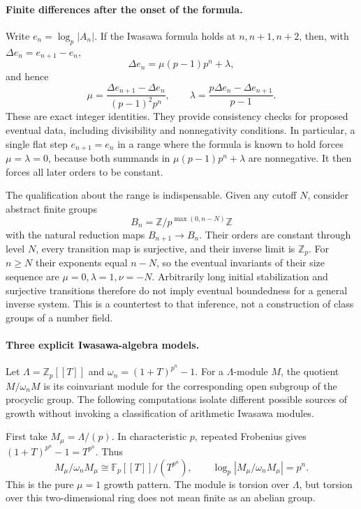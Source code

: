 \documentclass[11pt]{article}
\begin{document}
\paragraph{Finite differences after the onset of the formula.}
Write $e_n=\log_p|A_n|$. If the Iwasawa formula holds at $n,n+1,n+2$,
then, with $\Delta e_n=e_{n+1}-e_n$,
\[
 \Delta e_n=\mu(p-1)p^n+\lambda,
\]
and hence
\[
 \mu=\frac{\Delta e_{n+1}-\Delta e_n}{(p-1)^2p^n},
 \qquad
 \lambda=\frac{p\Delta e_n-\Delta e_{n+1}}{p-1}.       \tag{1}
\]
These are exact integer identities. They provide consistency checks
for proposed eventual data, including divisibility and nonnegativity
conditions. In particular, a single flat step $e_{n+1}=e_n$ in a range
where the formula is known to hold forces $\mu=\lambda=0$, because
both summands in $\mu(p-1)p^n+\lambda$ are nonnegative. It then forces
all later orders to be constant.

The qualification about the range is indispensable. Given any cutoff
$N$, consider abstract finite groups
\[
 B_n=\mathbb Z/p^{\max(0,n-N)}\mathbb Z
\]
with the natural reduction maps $B_{n+1}\to B_n$. Their orders are
constant through level $N$, every transition map is surjective, and
their inverse limit is $\mathbb Z_p$. For $n\ge N$ their exponents
equal $n-N$, so the eventual invariants of their size sequence are
$\mu=0,\lambda=1,\nu=-N$. Arbitrarily long initial stabilization and
surjective transitions therefore do not imply eventual boundedness
for a general inverse system. This is a countertest to that inference,
not a construction of class groups of a number field.

\paragraph{Three explicit Iwasawa-algebra models.}
Let $\Lambda=\mathbb Z_p[[T]]$ and
$\omega_n=(1+T)^{p^n}-1$. For a $\Lambda$-module $M$, the quotient
$M/\omega_n M$ is its coinvariant module for the corresponding open
subgroup of the procyclic group. The following computations isolate
different possible sources of growth without invoking a classification
of arithmetic Iwasawa modules.

First take $M_\mu=\Lambda/(p)$. In characteristic $p$, repeated
Frobenius gives $(1+T)^{p^n}-1=T^{p^n}$. Thus
\[
 M_\mu/\omega_nM_\mu\cong
 \mathbb F_p[[T]]/(T^{p^n}),\qquad
 \log_p|M_\mu/\omega_nM_\mu|=p^n.                  \tag{2}
\]
This is the pure $\mu=1$ growth pattern. The module is torsion over
$\Lambda$, but torsion over this two-dimensional ring does not mean
finite as an abelian group.
\end{document}

